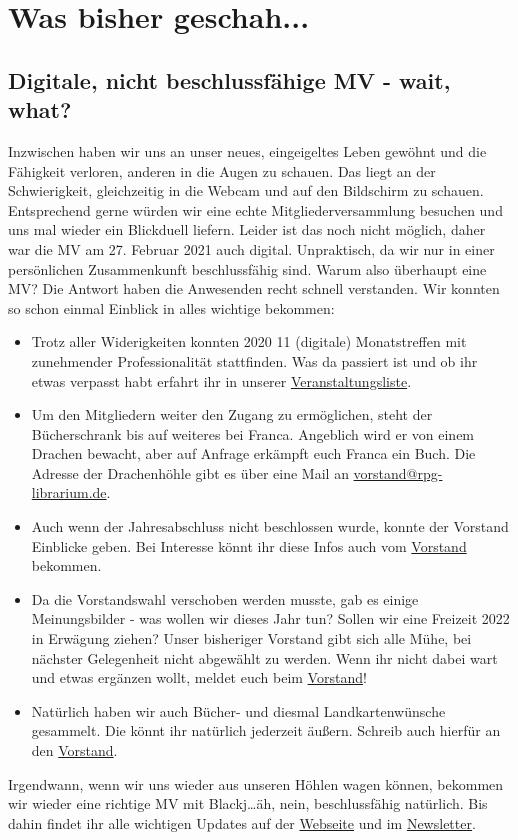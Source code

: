 \documentclass[final]{multiversum}
\begin{document}
\makemultititle
%

\section{Was bisher geschah...}

\subsection{Digitale, nicht beschlussfähige MV - wait, what?}
Inzwischen haben wir uns an unser neues, eingeigeltes Leben gewöhnt und die Fähigkeit verloren, anderen in die Augen zu schauen.
Das liegt an der Schwierigkeit, gleichzeitig in die Webcam und auf den Bildschirm zu schauen.
Entsprechend gerne würden wir eine echte Mitgliederversammlung besuchen und uns mal wieder ein Blickduell liefern. 
Leider ist das noch nicht möglich, daher war die MV am 27. Februar 2021 auch digital. 
Unpraktisch, da wir nur in einer persönlichen Zusammenkunft beschlussfähig sind.
Warum also überhaupt eine MV?
Die Antwort haben die Anwesenden recht schnell verstanden.
Wir konnten so schon einmal Einblick in alles wichtige bekommen:
\begin{itemize}
\item Trotz aller Widerigkeiten konnten 2020 11 (digitale) Monatstreffen mit zunehmender Professionalität stattfinden.
Was da passiert ist und ob ihr etwas verpasst habt erfahrt ihr in unserer \href{https://rpg-librarium.de/veranstaltungen/}{Veranstaltungsliste}.
\item Um den Mitgliedern weiter den Zugang zu ermöglichen, steht der Bücherschrank bis auf weiteres bei Franca. 
Angeblich wird er von einem Drachen bewacht, aber auf Anfrage erkämpft euch Franca ein Buch. 
Die Adresse der Drachenhöhle gibt es über eine Mail an \href{mailto:vorstand@rpg-librarium.de}{vorstand@rpg-librarium.de}.
\item Auch wenn der Jahresabschluss nicht beschlossen wurde, konnte der Vorstand Einblicke geben. 
Bei Interesse könnt ihr diese Infos auch vom \href{mailto:vorstand@rpg-librarium.de}{Vorstand} bekommen.
\item Da die Vorstandswahl verschoben werden musste, gab es einige Meinungsbilder - was wollen wir dieses Jahr tun? 
Sollen wir eine Freizeit 2022 in Erwägung ziehen? 
Unser bisheriger Vorstand gibt sich alle Mühe, bei nächster Gelegenheit nicht abgewählt zu werden. 
Wenn ihr nicht dabei wart und etwas ergänzen wollt, meldet euch beim \href{mailto:vorstand@rpg-librarium.de}{Vorstand}!
\item Natürlich haben wir auch Bücher- und diesmal Landkartenwünsche gesammelt.
Die könnt ihr natürlich jederzeit äußern. Schreib auch hierfür an den \href{mailto:vorstand@rpg-librarium.de}{Vorstand}.
\end{itemize}
Irgendwann, wenn wir uns wieder aus unseren Höhlen wagen können, bekommen wir wieder eine richtige MV mit Blackj\dots äh, nein, beschlussfähig natürlich. 
Bis dahin findet ihr alle wichtigen Updates auf der \href{https://rpg-librarium.de/}{Webseite} und im \href{https://lists.rpg-librarium.de/postorius/lists/newsletter.lists.rpg-librarium.de/}{Newsletter}.
\end{document}
